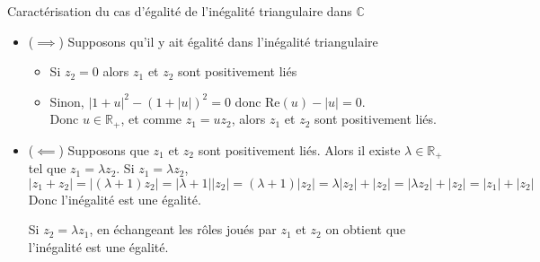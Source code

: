 \documentclass{article}
\renewenvironment{question_kholle}[2][ ]
{
	\subsection{\texorpdfstring{#2}{}}
	\notblank{#1}
	{
		\noindent #1
		\bigbreak
	}
	{}
	\begin{proof}
}
{
	\end{proof}
}
\begin{document}
\begin{question_kholle}{Caractérisation du cas d'égalité de l'inégalité triangulaire dans $\mathbb C$}
  \;\\
  \begin{itemize}[label=$\star$]
    \item ($\implies$) Supposons qu'il y ait égalité dans l'inégalité triangulaire
          \begin{itemize}[label=$\lozenge$]
            \item Si $z_{2} = 0$ alors $z_{1}$ et $z_{2}$ sont positivement liés
            \item Sinon, $\lvert 1+u \rvert ^{2} - (1+\lvert u \rvert )^{2}  = 0$ donc $\mathrm{Re}(u) - \lvert u \rvert = 0$.\\
                  Donc $u \in \mathbb{R}_{+}$, et comme $z_{1} = uz_{2}$, alors $z_{1}$ et $z_{2}$ sont positivement liés.
          \end{itemize}
    \item ($\impliedby$) Supposons que $z_{1}$ et $z_{2}$ sont positivement liés. Alors il existe $\lambda \in \mathbb{R}_{+}$ tel que $z_{1} = \lambda z_{2}$.
          Si $z_{1} = \lambda z_{2}$,
          $$
            \lvert z_{1}+z_{2} \rvert  = \lvert (\lambda+1) z_{2} \rvert  = \lvert \lambda + 1  \rvert \lvert z_{2} \rvert = (\lambda+1)\lvert z_{2} \rvert = \lambda \lvert z_{2} \rvert +\lvert z_{2} \rvert  = \lvert \lambda z_{2} \rvert +\lvert z_{2} \rvert = \lvert z_{1} \rvert + \lvert z_{2} \rvert
          $$
          Donc l'inégalité est une égalité.

          Si $z_{2} = \lambda z_{1}$, en échangeant les rôles joués par $z_{1}$ et $z_{2}$ on obtient que l'inégalité est une égalité.
  \end{itemize}
\end{question_kholle}
\end{document}
